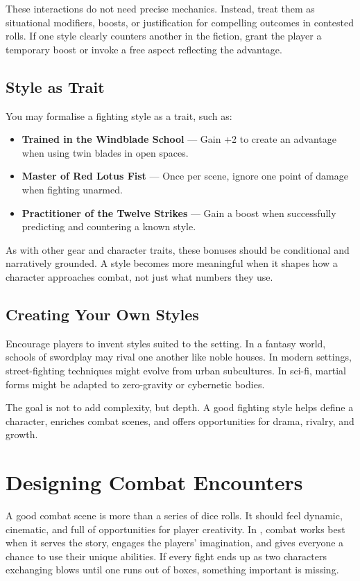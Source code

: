 \begin{multicols}{2}
These interactions do not need precise mechanics. Instead, treat them as situational modifiers, boosts, or justification for compelling outcomes in contested rolls. If one style clearly counters another in the fiction, grant the player a temporary boost or invoke a free aspect reflecting the advantage.

\subsection*{Style as Trait}

You may formalise a fighting style as a trait, such as:

\begin{itemize}
  \item \textbf{Trained in the Windblade School} — Gain +2 to create an advantage when using twin blades in open spaces.
  \item \textbf{Master of Red Lotus Fist} — Once per scene, ignore one point of damage when fighting unarmed.
  \item \textbf{Practitioner of the Twelve Strikes} — Gain a boost when successfully predicting and countering a known style.
\end{itemize}

As with other gear and character traits, these bonuses should be conditional and narratively grounded. A style becomes more meaningful when it shapes how a character approaches combat, not just what numbers they use.

\subsection*{Creating Your Own Styles}

Encourage players to invent styles suited to the setting. In a fantasy world, schools of swordplay may rival one another like noble houses. In modern settings, street-fighting techniques might evolve from urban subcultures. In sci-fi, martial forms might be adapted to zero-gravity or cybernetic bodies.

The goal is not to add complexity, but depth. A good fighting style helps define a character, enriches combat scenes, and offers opportunities for drama, rivalry, and growth.


\section{Designing Combat Encounters}

A good combat scene is more than a series of dice rolls. It should feel dynamic, cinematic, and full of opportunities for player creativity. In \wyrd, combat works best when it serves the story, engages the players' imagination, and gives everyone a chance to use their unique abilities. If every fight ends up as two characters exchanging blows until one runs out of boxes, something important is missing.


\end{multicols}
